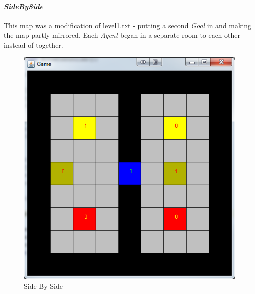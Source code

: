 \documentclass{IEEEtran}
\begin{document}
\paragraph{\emph{SideBySide}} This map was a modification of level1.txt - putting a second \emph{Goal} in and making the map partly mirrored. Each \emph{Agent} began in a separate room to each other instead of together.
\begin{figure}[H]
\centering
\includegraphics[scale=0.35]{level4}
\caption{Side By Side}
\label{SideBySide}
\end{figure}
\end{document}
